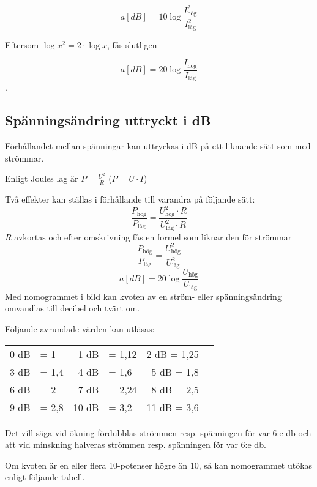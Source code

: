 \[a[dB] = 10\log \dfrac{I_\text{hög}^2}{I_\text{låg}^2}\]

Eftersom \(\log x^2 = 2 \cdot \log x\), fås slutligen

\[a[dB] = 20\log \dfrac{I_{\text{hög}}}{I_{\text{låg}}}\].

\subsection{Spänningsändring uttryckt i dB}

Förhållandet mellan spänningar kan uttryckas i dB på ett liknande sätt som med
strömmar.

Enligt Joules lag är \(P = \frac{U^2}{R}\) (\(P = U \cdot I\))

Två effekter kan ställas i förhållande till varandra på följande sätt:
\[\dfrac{P_\text{hög}}{P_\text{låg}}=\dfrac{U_\text{hög}^2 \cdot R}{U_\text{låg}^2 \cdot R}\]
\(R\) avkortas och efter omskrivning fås en formel som liknar den för strömmar
\[\dfrac{P_\text{hög}}{P_\text{låg}} = \dfrac{U_\text{hög}^2}{U_\text{låg}^2}\]
\[a[dB] = 20\log \dfrac{U_{\text{hög}}}{U_{\text{låg}}}\]
Med nomogrammet i bild  kan kvoten av en
ström- eller spänningsändring omvandlas till decibel och tvärt om.


Följande avrundade värden kan utläsas:

\begin{center}
\begin{tabular}{rlrlrl}
0 dB & = 1   &  1 dB & = 1,12 &  2 dB = 1,25 \\
3 dB & = 1,4 &  4 dB & = 1,6  &  5 dB = 1,8 \\
6 dB & = 2   &  7 dB & = 2,24 &  8 dB = 2,5 \\
9 dB & = 2,8 & 10 dB & = 3,2  & 11 dB = 3,6
\end{tabular}
\end{center}

Det vill säga vid ökning fördubblas strömmen resp. spänningen för var 6:e
\si{\decibel} och att vid minskning halveras strömmen resp. spänningen för var
6:e \si{\decibel}.

Om kvoten är en eller flera 10-potenser högre än 10, så kan nomogrammet utökas
enligt följande tabell.

